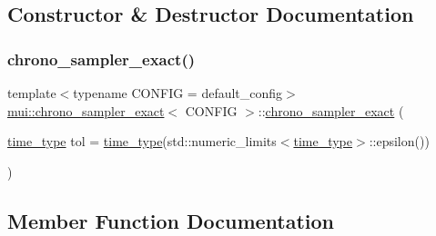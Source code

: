 \subsection{Constructor \& Destructor Documentation}
\mbox{\label{classmui_1_1chrono__sampler__exact_ad1293d1816ab17b696ed8c1d665c9cae}} 
\subsubsection{\texorpdfstring{chrono\+\_\+sampler\+\_\+exact()}{chrono\_sampler\_exact()}}
{\footnotesize\ttfamily template$<$typename C\+O\+N\+F\+IG  = default\+\_\+config$>$ \\
\hyperlink{classmui_1_1chrono__sampler__exact}{mui\+::chrono\+\_\+sampler\+\_\+exact}$<$ C\+O\+N\+F\+IG $>$\+::\hyperlink{classmui_1_1chrono__sampler__exact}{chrono\+\_\+sampler\+\_\+exact} (\begin{DoxyParamCaption}\item[{\hyperlink{classmui_1_1chrono__sampler__exact_a5f9178b26822fe901f8a1e97ada68d95}{time\+\_\+type}}]{tol = {\ttfamily \hyperlink{classmui_1_1chrono__sampler__exact_a5f9178b26822fe901f8a1e97ada68d95}{time\+\_\+type}(std\+:\+:numeric\+\_\+limits$<$\hyperlink{classmui_1_1chrono__sampler__exact_a5f9178b26822fe901f8a1e97ada68d95}{time\+\_\+type}$>$\+:\+:epsilon())} }\end{DoxyParamCaption})\hspace{0.3cm}{\ttfamily [inline]}}



\subsection{Member Function Documentation}
\mbox{\label{classmui_1_1chrono__sampler__exact_a8bef847fd06c25c4f8869b0a962a6193}} 

